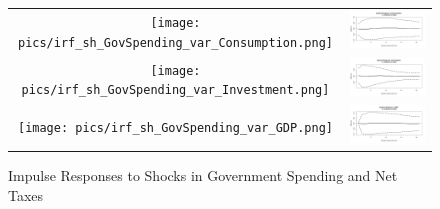 \documentclass[12pt]{article}
\begin{document}
\begin{figure}\caption{Impulse Responses to Shocks in Government Spending and Net Taxes}\label{fg:irf}
\begin{center}
\hspace*{-0.2in}\begin{tabular}{cc}
\texttt{[image: pics/irf\_sh\_GovSpending\_var\_Consumption.png]} & \includegraphics[scale=0.34]{pics/irf_sh_Taxes_var_Consumption.png} \\
\texttt{[image: pics/irf\_sh\_GovSpending\_var\_Investment.png]} & \includegraphics[scale=0.34]{pics/irf_sh_Taxes_var_Investment.png} \\
\texttt{[image: pics/irf\_sh\_GovSpending\_var\_GDP.png]} & \includegraphics[scale=0.34]{pics/irf_sh_Taxes_var_GDP.png} \\

\end{tabular}
\end{center}
\end{figure}
\end{document}
